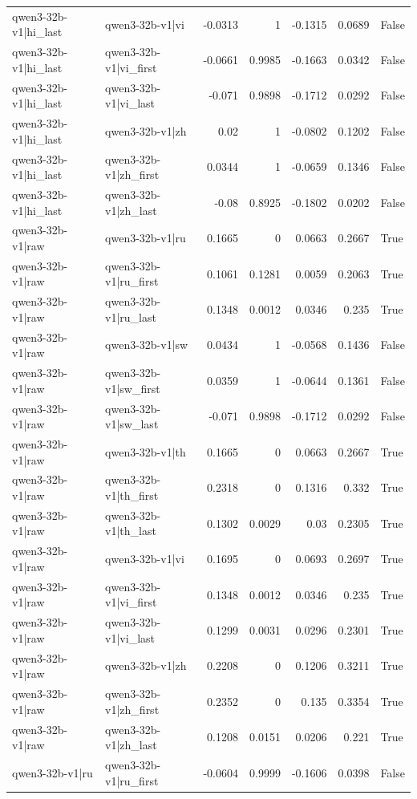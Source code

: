 \begin{table}
\begin{tabular}{l l r r r r l}
qwen3-32b-v1|hi_last & qwen3-32b-v1|vi & -0.0313 & 1 & -0.1315 & 0.0689 & False \\
qwen3-32b-v1|hi_last & qwen3-32b-v1|vi_first & -0.0661 & 0.9985 & -0.1663 & 0.0342 & False \\
qwen3-32b-v1|hi_last & qwen3-32b-v1|vi_last & -0.071 & 0.9898 & -0.1712 & 0.0292 & False \\
qwen3-32b-v1|hi_last & qwen3-32b-v1|zh & 0.02 & 1 & -0.0802 & 0.1202 & False \\
qwen3-32b-v1|hi_last & qwen3-32b-v1|zh_first & 0.0344 & 1 & -0.0659 & 0.1346 & False \\
qwen3-32b-v1|hi_last & qwen3-32b-v1|zh_last & -0.08 & 0.8925 & -0.1802 & 0.0202 & False \\
qwen3-32b-v1|raw & qwen3-32b-v1|ru & 0.1665 & 0 & 0.0663 & 0.2667 & True \\
qwen3-32b-v1|raw & qwen3-32b-v1|ru_first & 0.1061 & 0.1281 & 0.0059 & 0.2063 & True \\
qwen3-32b-v1|raw & qwen3-32b-v1|ru_last & 0.1348 & 0.0012 & 0.0346 & 0.235 & True \\
qwen3-32b-v1|raw & qwen3-32b-v1|sw & 0.0434 & 1 & -0.0568 & 0.1436 & False \\
qwen3-32b-v1|raw & qwen3-32b-v1|sw_first & 0.0359 & 1 & -0.0644 & 0.1361 & False \\
qwen3-32b-v1|raw & qwen3-32b-v1|sw_last & -0.071 & 0.9898 & -0.1712 & 0.0292 & False \\
qwen3-32b-v1|raw & qwen3-32b-v1|th & 0.1665 & 0 & 0.0663 & 0.2667 & True \\
qwen3-32b-v1|raw & qwen3-32b-v1|th_first & 0.2318 & 0 & 0.1316 & 0.332 & True \\
qwen3-32b-v1|raw & qwen3-32b-v1|th_last & 0.1302 & 0.0029 & 0.03 & 0.2305 & True \\
qwen3-32b-v1|raw & qwen3-32b-v1|vi & 0.1695 & 0 & 0.0693 & 0.2697 & True \\
qwen3-32b-v1|raw & qwen3-32b-v1|vi_first & 0.1348 & 0.0012 & 0.0346 & 0.235 & True \\
qwen3-32b-v1|raw & qwen3-32b-v1|vi_last & 0.1299 & 0.0031 & 0.0296 & 0.2301 & True \\
qwen3-32b-v1|raw & qwen3-32b-v1|zh & 0.2208 & 0 & 0.1206 & 0.3211 & True \\
qwen3-32b-v1|raw & qwen3-32b-v1|zh_first & 0.2352 & 0 & 0.135 & 0.3354 & True \\
qwen3-32b-v1|raw & qwen3-32b-v1|zh_last & 0.1208 & 0.0151 & 0.0206 & 0.221 & True \\
qwen3-32b-v1|ru & qwen3-32b-v1|ru_first & -0.0604 & 0.9999 & -0.1606 & 0.0398 & False \\

\end{tabular}
\end{table}
